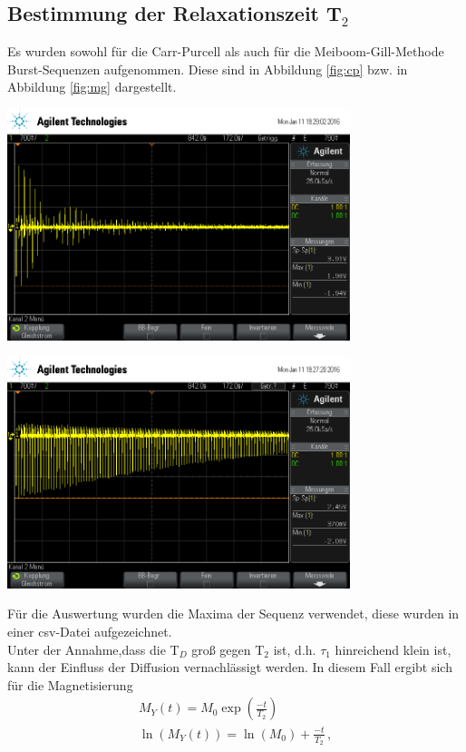 \documentclass[]{scrartcl}
\begin{document}
\subsection{Bestimmung der Relaxationszeit T$_2$}
Es wurden sowohl für die Carr-Purcell als auch für die Meiboom-Gill-Methode Burst-Sequenzen aufgenommen. Diese sind in Abbildung \ref{fig:cp} bzw. in Abbildung \ref{fig:mg} dargestellt.
\begin{center}
	\includegraphics[width=10cm]{images/carrpur.png}
	\label{fig:cp}
\end{center}
\begin{center}
	\includegraphics[width=10cm]{images/meigill.png}
	\label{fig:mg}
\end{center}
Für die Auswertung wurden die Maxima der Sequenz verwendet, diese wurden in einer csv-Datei aufgezeichnet. \\
Unter der Annahme,dass die T$_D$ groß gegen T$_2$ ist, d.h. $\tau_1$ hinreichend klein ist, kann der Einfluss der Diffusion vernachlässigt werden. In diesem Fall ergibt sich für die Magnetisierung 
\begin{align}
M_Y(t)=M_0\exp\left( \frac{-t}{T_2}\right) \\
\ln(M_Y(t))=\ln(M_0) + \frac{-t}{T_2}\,  ,
\end{align}
\end{document}
